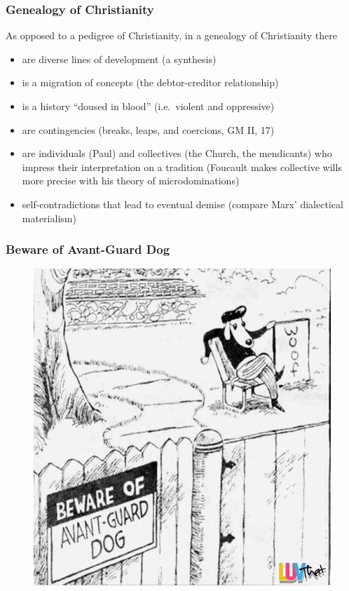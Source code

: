 \documentclass[xcolor=dvipsnames]{beamer}
\begin{document}
\begin{frame}
  \frametitle{Genealogy of Christianity}
  As opposed to a pedigree of Christianity, in a genealogy of
  Christianity there 
  \begin{itemize}
  \item are diverse lines of development (a synthesis)
  \item is a migration of concepts (the debtor-creditor relationship)
  \item is a history ``doused in blood'' (i.e.\ violent and oppressive)
  \item are contingencies (breaks, leaps, and coercions, GM II, 17)
  \item are individuals (Paul) and collectives (the Church, the
    mendicants) who impress their interpretation on a tradition
    (Foucault makes collective wills more precise with his theory of
    microdominations)
  \item self-contradictions that lead to eventual demise (compare
    Marx' dialectical materialism)
  \end{itemize}
\end{frame}

\begin{frame}
  \frametitle{Beware of Avant-Guard Dog}
  \begin{figure}[h]
    \includegraphics[scale=0.28]{./BewareTheAvantGuardDog.jpg}
  \end{figure}
\end{frame}
\end{document}

